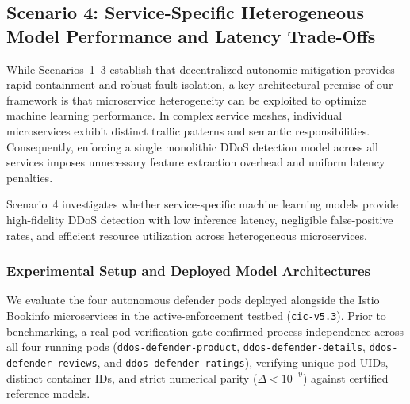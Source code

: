 
\subsection{Scenario 4: Service-Specific Heterogeneous Model Performance and Latency Trade-Offs}
\label{sec:scenario4_heterogeneous_models}

While Scenarios~1--3 establish that decentralized autonomic mitigation provides rapid containment and robust fault isolation, a key architectural premise of our framework is that microservice heterogeneity can be exploited to optimize machine learning performance. In complex service meshes, individual microservices exhibit distinct traffic patterns and semantic responsibilities. Consequently, enforcing a single monolithic DDoS detection model across all services imposes unnecessary feature extraction overhead and uniform latency penalties. 

Scenario~4 investigates whether service-specific machine learning models provide high-fidelity DDoS detection with low inference latency, negligible false-positive rates, and efficient resource utilization across heterogeneous microservices.

\subsubsection{Experimental Setup and Deployed Model Architectures}
We evaluate the four autonomous defender pods deployed alongside the Istio Bookinfo microservices in the active-enforcement testbed (\texttt{cic-v5.3}). Prior to benchmarking, a real-pod verification gate confirmed process independence across all four running pods (\texttt{ddos-defender-product}, \texttt{ddos-defender-details}, \texttt{ddos-defender-reviews}, and \texttt{ddos-defender-ratings}), verifying unique pod UIDs, distinct container IDs, and strict numerical parity ($\Delta < 10^{-9}$) against certified reference models.

